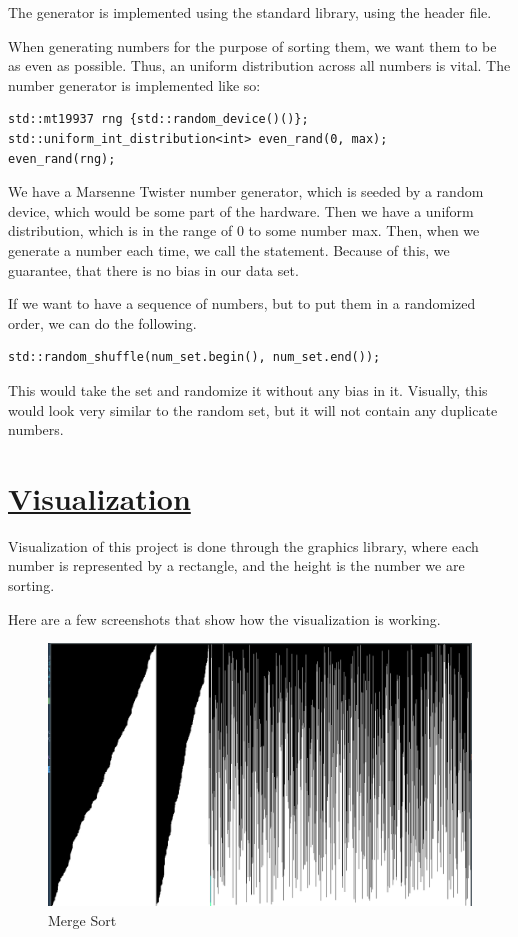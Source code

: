 \documentclass{article}
\newcommand{\code}[1]{\codeinline{\texttt{#1}}}
\begin{document}
The generator is implemented using the standard \code{C++} library, using the \code{<random>} header file.

When generating numbers for the purpose of sorting them, we want them to be as even as possible. Thus, an uniform distribution across all numbers is vital. The number generator is implemented like so:

\begin{lstlisting}
std::mt19937 rng {std::random_device()()};
std::uniform_int_distribution<int> even_rand(0, max);
even_rand(rng);
\end{lstlisting}

We have a Marsenne Twister number generator, which is seeded by a random device, which would be some part of the hardware. Then we have a uniform distribution, which is in the range of 0 to some number max. Then, when we generate a number each time, we call the \code{even\_rand(rng)} statement. Because of this, we guarantee, that there is no bias in our data set.

If we want to have a sequence of numbers, but to put them in a randomized order, we can do the following.

\begin{lstlisting}
std::random_shuffle(num_set.begin(), num_set.end());
\end{lstlisting}

This would take the set and randomize it without any bias in it. Visually, this would look very similar to the random set, but it will not contain any duplicate numbers.

\section{\underline{Visualization}}

Visualization of this project is done through the \code{SDL2} graphics library, where each number is represented by a rectangle, and the height is the number we are sorting.

Here are a few screenshots that show how the visualization is working.

\begin{figure}[H]
  \centering
  \includegraphics[width=\linewidth,scale=0.4]{./screenshot1.png}
  \caption{Merge Sort}
  \label{fig:Merge Sort}
\end{figure}
\end{document}
